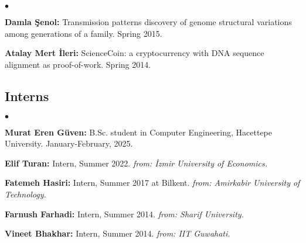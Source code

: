 \documentclass[margin,line]{res}
\newenvironment{list2}{
  \begin{list}{$\bullet$}{%
      \setlength{\itemsep}{0.1cm}
      \setlength{\parsep}{0in} \setlength{\parskip}{0in}
      \setlength{\topsep}{0in} \setlength{\partopsep}{0in} 
      \setlength{\leftmargin}{0.2in}}}{\end{list}}
\begin{document}
\begin{resume}
\begin{list2}
  \item
    {\bf Damla Şenol:} Transmission patterns discovery of genome structural variations among generations of a family. Spring 2015.
  \item
    {\bf Atalay Mert İleri:} ScienceCoin: a cryptocurrency with DNA sequence alignment as proof-of-work. Spring 2014.
  \end{list2}
\vspace*{-.4cm}
\subsection{\small \sc Interns}
\begin{list2}
\item 
    \textbf{Murat Eren Güven:} B.Sc. student in Computer Engineering,  Hacettepe University. January-February, 2025.
\item
  {\bf Elif Turan:} Intern, Summer 2022. \textit{from: İzmir University of Economics. }
\item
  {\bf Fatemeh Hasiri:} Intern, Summer 2017 at Bilkent. \textit{from: Amirkabir University of Technology.} %
\item
  {\bf Farnush Farhadi:} Intern, Summer 2014. \textit{from: Sharif University.}
\item
  {\bf Vineet Bhakhar:} Intern, Summer 2014.  \textit{from: IIT Guwahati.}
\end{list2}

\vspace*{-.4cm}

\end{resume}
\end{document}
